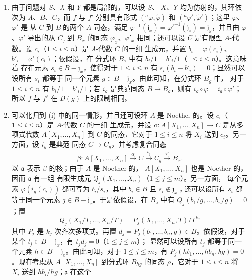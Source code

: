\documentclass[UTF8,fontset=none,11pt,oneside,openany]{ctexbook}
\newcommand{\oldpage}[2][]{%
  \hypertarget{ega-source-page-#1-#2}{}%
  \marginnote{\scriptsize\textbf{#1}~|~#2}\ignorespaces}
\begin{document}
\begin{enumerate}
  \item[(i)] 由于问题对 $S$、$X$ 和 $Y$ 都是局部的，可以设 $S$、
    $X$、$Y$ 均为仿射的，其环依次为 $A$、$B$、$C$，而 $f$ 与 $f'$
    分别具有形式 $({}^a\varphi,\widetilde{\varphi})$ 和
    $({}^a\varphi',\widetilde{\varphi}')$；这里 $\varphi$、$\varphi'$ 是
    从 $C$ 到 $B$ 的两个 $A$-同态，满足
    $\varphi^{-1}(\mathfrak{j}_x)={\varphi'}^{-1}(\mathfrak{j}_x)
    =\mathfrak{j}_y$，并且由 $\varphi$、$\varphi'$ 导出的从 $C_y$ 到
    $B_x$ 的同态 $\varphi_x$、$\varphi'_x$ 相同；还可以设 $C$ 是有限型
    $A$-代数。设 $c_i$（$1\leq i\leq n$）是 $A$-代数 $C$ 的一组
    生成元，并置 $b_i=\varphi(c_i)$、$b'_i=\varphi'(c_i)$；依假设，在
    分式环 $B_x$ 中有 $b_i/1=b'_i/1$（$1\leq i\leq n$）。这意味着
    存在元素 $s_i\in B-\mathfrak{j}_x$，使得对于
    $1\leq i\leq n$ 有 $s_i(b_i-b'_i)=0$；显然可以设所有 $s_i$ 都等于
    同一个元素 $g\in B-\mathfrak{j}_x$。由此可知，在分式环 $B_g$ 中，
    对于 $1\leq i\leq n$ 有 $b_i/1=b'_i/1$；若 $i_g$ 是典范同态
    $B\to B_g$，则有 $i_g\circ\varphi=i_g\circ\varphi'$；所以 $f$ 与
    $f'$ 在 $D(g)$ 上的限制相同。
  \item[(ii)] 可以化归到 (i) 中的同一情形，并且还可设环 $A$ 是
    Noether 的。设 $c_i$（$1\leq i\leq n$）是 $A$-代数 $C$ 的一组
    生成元，并设
    $\alpha:A[X_1,\ldots,X_n]\to C$ 是从多项式代数
    $A[X_1,\ldots,X_n]$ 到 $C$ 的同态，它对于
    $1\leq i\leq n$ 将 $X_i$ 送到 $c_i$。另一方面，设 $i_y$ 是典范
    同态 $C\to C_y$，并考虑复合同态
    \[
      \beta:A[X_1,\ldots,X_n]
      \xrightarrow{\alpha} C
      \xrightarrow{i_y} C_y
      \xrightarrow{\varphi} B_x.
    \]
    以 $\mathfrak{a}$ 表示 $\beta$ 的核；由于 $A$ 是 Noether 的，
    $A[X_1,\ldots,X_n]$ 也是 Noether 的，因而 $\mathfrak{a}$ 有一组
    有限生成元 $Q_j(X_1,\ldots,X_n)$（$1\leq j\leq m$）。另一方面，
    每个元素 $\varphi(i_y(c_i))$ 都可写为 $b_i/s_i$，其中 $b_i\in B$
    且 $s_i\notin\mathfrak{j}_x$；还可以设所有 $s_i$ 都等于同一个元素
    $g\in B-\mathfrak{j}_x$。于是依假设，在 $B_x$ 中有
    $Q_j(b_1/g,\ldots,b_n/g)=0$；置
    \[
      Q_j(X_1/T,\ldots,X_n/T)
      =P_j(X_1,\ldots,X_n,T)/T^{k_j}
    \]
    其中 $P_j$ 是 $k_j$ 次齐次多项式。再置
    $d_j=P_j(b_1,\ldots,b_n,g)\in B$。依假设，对于某个
    $t_j\in B-\mathfrak{j}_x$，有 $t_jd_j=0$（$1\leq j\leq m$）；
    显然可以设所有 $t_j$
\oldpage[I]{151}
    都等于同一个元素 $h\in B-\mathfrak{j}_x$。由此可知，对于
    $1\leq j\leq m$，有 $P_j(hb_1,\ldots,hb_n,hg)=0$。现在考虑从
    $A[X_1,\ldots,X_n]$ 到分式环 $B_{hg}$ 的同态 $\rho$，它对于
    $1\leq i\leq n$ 将 $X_i$ 送到 $hb_i/hg$；$\mathfrak{a}$ 在这个

\end{enumerate}
\end{document}
